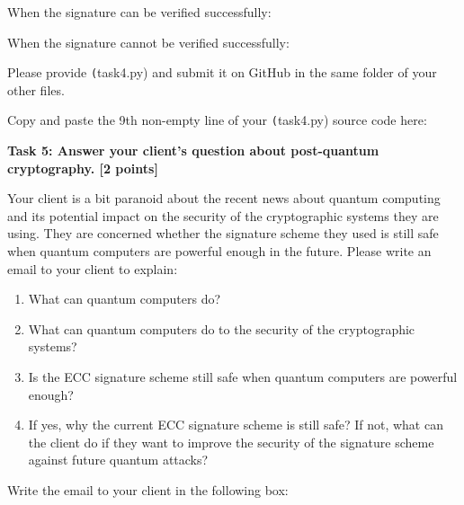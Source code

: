 \documentclass[answer]{exam}  %
\newcommand\FillAnswer[1][]{{\color{blue}\textbf{}}}
\begin{document}
When the signature can be verified successfully:



When the signature cannot be verified successfully:



Please provide \texttt(task4.py) and submit it on GitHub in the same folder of your other files.
\fi

Copy and paste the 9th non-empty line of your \texttt(task4.py) source code here:

\fbox{\parbox{\textwidth}{
    \FillAnswer{}
}}

\ifanswer\else
\qnewpage
\fi


\textbf{Task 5: Answer your client's question about post-quantum cryptography. [2 points]}


\ifanswer\else

Your client is a bit paranoid about the recent news about quantum computing and its potential impact on the security of the cryptographic systems they are using. They are concerned whether the signature scheme they used is still safe when quantum computers are powerful enough in the future. Please write an email to your client to explain:

\begin{enumerate}
    \item What can quantum computers do?
    \item What can quantum computers do to the security of the cryptographic systems? 
    \item Is the ECC signature scheme still safe when quantum computers are powerful enough?
    \item If yes, why the current ECC signature scheme is still safe? If not, what can the client do if they want to improve the security of the signature scheme against future quantum attacks?
\end{enumerate}

\fi

Write the email to your client in the following box:
\end{document}
